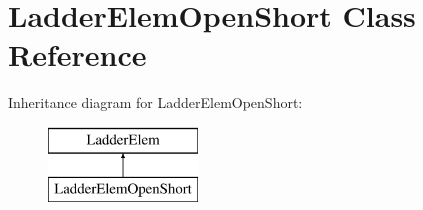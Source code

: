 \hypertarget{class_ladder_elem_open_short}{\section{Ladder\-Elem\-Open\-Short Class Reference}
\label{class_ladder_elem_open_short}
}
Inheritance diagram for Ladder\-Elem\-Open\-Short\-:\begin{figure}[H]
\begin{center}
\leavevmode
\includegraphics[height=2.000000cm]{class_ladder_elem_open_short}
\end{center}
\end{figure}
